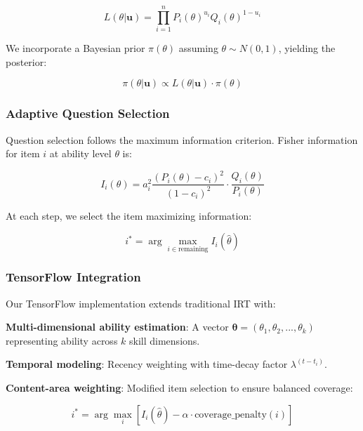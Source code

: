 \documentclass[conference]{IEEEtran}
\begin{document}
\begin{equation}
L(\theta | \mathbf{u}) = \prod_{i=1}^{n} P_i(\theta)^{u_i} Q_i(\theta)^{1-u_i}
\end{equation}

We incorporate a Bayesian prior $\pi(\theta)$ assuming $\theta \sim N(0, 1)$, yielding the posterior:

\begin{equation}
\pi(\theta | \mathbf{u}) \propto L(\theta | \mathbf{u}) \cdot \pi(\theta)
\end{equation}

\subsubsection{Adaptive Question Selection}

Question selection follows the maximum information criterion. Fisher information for item $i$ at ability level $\theta$ is:

\begin{equation}
I_i(\theta) = a_i^2 \frac{(P_i(\theta) - c_i)^2}{(1 - c_i)^2} \cdot \frac{Q_i(\theta)}{P_i(\theta)}
\end{equation}

At each step, we select the item maximizing information:

\begin{equation}
i^* = \arg\max_{i \in \text{remaining}} I_i(\hat{\theta})
\end{equation}

\subsubsection{TensorFlow Integration}

Our TensorFlow implementation extends traditional IRT with:

\textbf{Multi-dimensional ability estimation}: A vector $\boldsymbol{\theta} = (\theta_1, \theta_2, ..., \theta_k)$ representing ability across $k$ skill dimensions.

\textbf{Temporal modeling}: Recency weighting with time-decay factor $\lambda^{(t - t_i)}$.

\textbf{Content-area weighting}: Modified item selection to ensure balanced coverage:

\begin{equation}
i^* = \arg\max_{i} \left[ I_i(\hat{\theta}) - \alpha \cdot \text{coverage\_penalty}(i) \right]
\end{equation}
\end{document}
